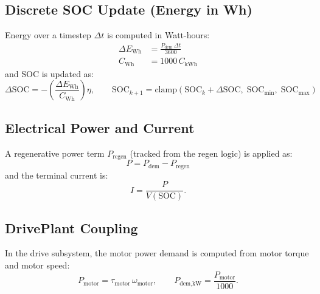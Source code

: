 \documentclass[11pt,a4paper]{article}
\begin{document}
\subsection{Discrete SOC Update (Energy in Wh)}
Energy over a timestep $\Delta t$ is computed in Watt-hours:
\begin{align}
\Delta E_{\text{Wh}} &= \frac{P_{\text{dem}}\,\Delta t}{3600} \\
C_{\text{Wh}} &= 1000\,C_{\text{kWh}}
\end{align}
and SOC is updated as:
\begin{equation}
\Delta\mathrm{SOC} = -\left(\frac{\Delta E_{\text{Wh}}}{C_{\text{Wh}}}\right)\eta,
\qquad
\mathrm{SOC}_{k+1}=\mathrm{clamp}\!\left(\mathrm{SOC}_k+\Delta\mathrm{SOC},\;\mathrm{SOC}_{\min},\;\mathrm{SOC}_{\max}\right)
\label{eq:batt_soc_update}
\end{equation}

\subsection{Electrical Power and Current}
A regenerative power term $P_{\text{regen}}$ (tracked from the regen logic) is applied as:
\begin{equation}
P = P_{\text{dem}} - P_{\text{regen}}
\label{eq:batt_net_power}
\end{equation}
and the terminal current is:
\begin{equation}
I = \frac{P}{V(\mathrm{SOC})}.
\label{eq:batt_current}
\end{equation}

\subsection{DrivePlant Coupling}
In the drive subsystem, the motor power demand is computed from motor torque and motor speed:
\begin{equation}
P_{\text{motor}} = \tau_{\text{motor}}\,\omega_{\text{motor}},
\qquad
P_{\text{dem,kW}} = \frac{P_{\text{motor}}}{1000}.
\label{eq:drive_power_demand}
\end{equation}
\end{document}
